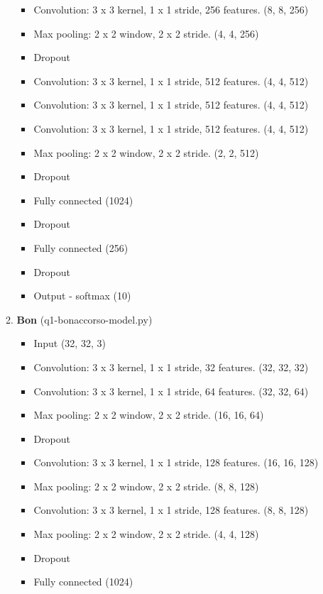\documentclass[11pt]{article}
\begin{document}
\begin{enumerate}
\begin{enumerate}
\begin{itemize}
                \item Convolution: 3 x 3 kernel, 1 x 1 stride, 256 features. (8, 8, 256)
                \item Max pooling: 2 x 2 window, 2 x 2 stride. (4, 4, 256)
                \item Dropout
                \item Convolution: 3 x 3 kernel, 1 x 1 stride, 512 features. (4, 4, 512)
                \item Convolution: 3 x 3 kernel, 1 x 1 stride, 512 features. (4, 4, 512)
                \item Convolution: 3 x 3 kernel, 1 x 1 stride, 512 features. (4, 4, 512)
                \item Max pooling: 2 x 2 window, 2 x 2 stride. (2, 2, 512)
                \item Dropout
                \item Fully connected (1024)
                \item Dropout
                \item Fully connected (256)
                \item Dropout
                \item Output - softmax (10)
            \end{itemize}
        \item \textbf{Bon} (q1-bonaccorso-model.py)
            \begin{itemize}
                \item Input (32, 32, 3)
                \item Convolution: 3 x 3 kernel, 1 x 1 stride, 32 features. (32, 32, 32)
                \item Convolution: 3 x 3 kernel, 1 x 1 stride, 64 features. (32, 32, 64)
                \item Max pooling: 2 x 2 window, 2 x 2 stride. (16, 16, 64)
                \item Dropout
                \item Convolution: 3 x 3 kernel, 1 x 1 stride, 128 features. (16, 16, 128)
                \item Max pooling: 2 x 2 window, 2 x 2 stride. (8, 8, 128)
                \item Convolution: 3 x 3 kernel, 1 x 1 stride, 128 features. (8, 8, 128)
                \item Max pooling: 2 x 2 window, 2 x 2 stride. (4, 4, 128)
                \item Dropout
                \item Fully connected (1024)

\end{itemize}
\end{enumerate}
\end{enumerate}
\end{document}
